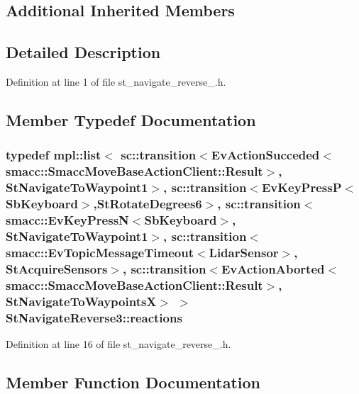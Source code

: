 \subsection*{Additional Inherited Members}


\subsection{Detailed Description}


Definition at line 1 of file st\+\_\+navigate\+\_\+reverse\+\_.\+h.



\subsection{Member Typedef Documentation}
\subsubsection[{\texorpdfstring{reactions}{reactions}}]{\setlength{\rightskip}{0pt plus 5cm}typedef mpl\+::list$<$ sc\+::transition$<$Ev\+Action\+Succeded$<$smacc\+::\+Smacc\+Move\+Base\+Action\+Client\+::\+Result$>$, {\bf St\+Navigate\+To\+Waypoint1}$>$, sc\+::transition$<$Ev\+Key\+PressP$<$Sb\+Keyboard$>$,{\bf St\+Rotate\+Degrees6}$>$, sc\+::transition$<${\bf smacc\+::\+Ev\+Key\+PressN}$<$Sb\+Keyboard$>$, {\bf St\+Navigate\+To\+Waypoint1}$>$, sc\+::transition$<${\bf smacc\+::\+Ev\+Topic\+Message\+Timeout}$<${\bf Lidar\+Sensor}$>$, {\bf St\+Acquire\+Sensors}$>$, sc\+::transition$<$Ev\+Action\+Aborted$<$smacc\+::\+Smacc\+Move\+Base\+Action\+Client\+::\+Result$>$, {\bf St\+Navigate\+To\+WaypointsX}$>$ $>$ {\bf St\+Navigate\+Reverse3\+::reactions}}\hypertarget{structStNavigateReverse3_ae78d5eb8678ce6a8f7ac772ca2b6ac7a}{}\label{structStNavigateReverse3_ae78d5eb8678ce6a8f7ac772ca2b6ac7a}


Definition at line 16 of file st\+\_\+navigate\+\_\+reverse\+\_.\+h.



\subsection{Member Function Documentation}
